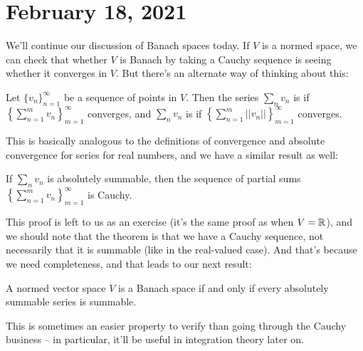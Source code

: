 \pagebreak\section{February 18, 2021}

We'll continue our discussion of Banach spaces today. If $V$ is a normed space, we can check that whether $V$ is Banach by taking a Cauchy sequence is seeing whether it converges in $V$. But there's an alternate way of thinking about this:

\begin{definition}
Let $\{v_n\}_{n=1}^{\infty}$ be a sequence of points in $V$. Then the series $\sum_{n} v_n$ is  if $\left\{\sum_{n=1}^m v_n\right\}_{m=1}^{\infty}$ converges, and $\sum_n v_n$ is  if $\left\{\sum_{n=1}^m ||v_n||\right\}_{m=1}^{\infty}$ converges.
\end{definition}

This is basically analogous to the definitions of convergence and absolute convergence for series for real numbers, and we have a similar result as well:

\begin{proposition}
If $\sum_n v_n$ is absolutely summable, then the sequence of partial sums $\left\{\sum_{n=1}^m v_n\right\}_{m=1}^{\infty}$ is Cauchy.
\end{proposition}

This proof is left to us as an exercise (it's the same proof as when $V = \mathbb R$), and we should note that the theorem is that we have a Cauchy sequence, not necessarily that it is summable (like in the real-valued case). And that's because we need completeness, and that leads to our next result:

\begin{theorem}\label{summabilitybanach}
A normed vector space $V$ is a Banach space if and only if every absolutely summable series is summable.
\end{theorem}

This is sometimes an easier property to verify than going through the Cauchy business -- in particular, it'll be useful in integration theory later on.


